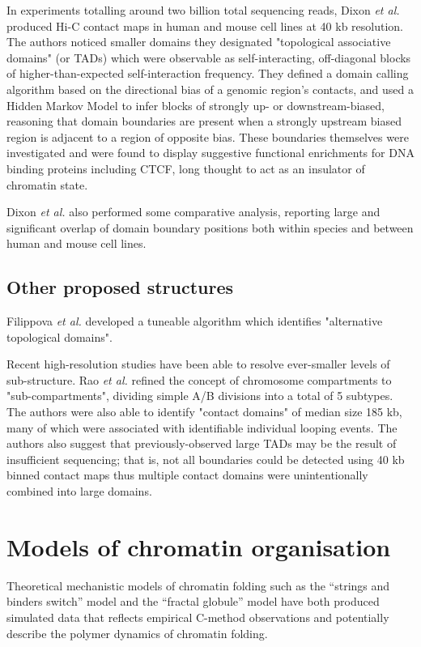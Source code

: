 \documentclass[a4paper,10pt,oneside]{book}
\begin{document}
In experiments totalling around two billion total sequencing reads, Dixon \emph{et al.}\cite{Dixon2012} produced Hi-C contact maps in human and mouse cell lines at 40 kb resolution. The authors noticed smaller domains they designated "topological associative domains" (or TADs) which were observable as self-interacting, off-diagonal blocks of higher-than-expected self-interaction frequency. They defined a domain calling algorithm based on the directional bias of a genomic region's contacts, and used a Hidden Markov Model to infer blocks of strongly up- or downstream-biased, reasoning that domain boundaries are present when a strongly upstream biased region is adjacent to a region of opposite bias. These boundaries themselves were investigated and were found to display suggestive functional enrichments for DNA binding proteins including CTCF, long thought to act as an insulator of chromatin state.

Dixon \emph{et al.}\cite{Dixon2012} also performed some comparative analysis, reporting large and significant overlap of domain boundary positions both within species and between human and mouse cell lines.

\subsection{Other proposed structures}

Filippova \emph{et al.}\cite{Filippova2014} developed a tuneable algorithm which identifies "alternative topological domains".

Recent high-resolution studies have been able to resolve ever-smaller levels of sub-structure. Rao \emph{et al.}\cite{Rao2014} refined the concept of chromosome compartments to "sub-compartments", dividing simple A/B divisions into a total of 5 subtypes. The authors were also able to identify "contact domains" of median size 185 kb, many of which were associated with identifiable individual looping events.\cite{Rao2014} The authors also suggest that previously-observed large TADs may be the result of insufficient sequencing; that is, not all boundaries could be detected using 40 kb binned contact maps thus multiple contact domains were unintentionally combined into large domains.

\section{Models of chromatin organisation}

Theoretical mechanistic models of chromatin folding such as the
``strings and binders switch'' model\cite{Barbieri2012} and the ``fractal
globule'' model\cite{Lieberman2011, Mirny2011, Grosberg1988a} have both produced simulated data
that reflects empirical C-method observations and potentially describe the polymer
dynamics of chromatin folding.
\end{document}
